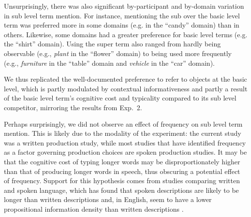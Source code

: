 \documentclass[11pt]{article}
\newcommand{\jd}[1]{\textcolor{Red}{[jd: #1]}}
\newcommand{\figref}[1]{Figure \ref{#1}}
\begin{document}
%


Unsurprisingly, there was also significant by-participant and by-domain variation in sub level term mention. %
For instance, mentioning the sub over the basic level term was preferred more in some domains (e.g. in the ``candy'' domain) than in others. Likewise, some domains had a greater preference for basic level terms (e.g. the ``shirt'' domain). Using the super term also ranged from hardly being observable (e.g., \emph{plant} in the ``flower'' domain) to being used more frequently (e.g., \emph{furniture} in the ``table'' domain and \emph{vehicle} in the ``car'' domain). 

We thus replicated the well-documented preference to refer to objects at the basic level, which is partly modulated by contextual informativeness and partly a result of the basic level term's cognitive cost and typicality compared to its sub level competitor, mirroring the results from Exp.~2. 

Perhaps surprisingly, we did not observe an effect of frequency on sub level term mention. This is likely due to the modality of the experiment: the current study was a written production study, while most studies that have identified frequency as a factor governing production choices are spoken production studies. It may be that the cognitive cost of typing longer words may be disproportionately higher than that of producing longer words in speech, thus obscuring a potential effect of frequency. Support for this hypothesis comes from studies comparing written and spoken language, which has found that spoken descriptions are likely to be longer than written descriptions and, in English, seem to have a lower propositional information density than written descriptions \cite{VanMiltenburg2018}.
\end{document}
